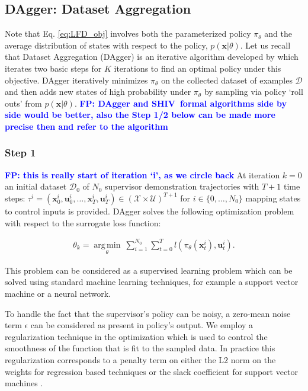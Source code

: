 \documentclass[10pt, conference]{ieeeconf}      %
\DeclareMathOperator*{\argmin}{arg\,min}
\newcommand{\bu}{\mathbf{u}}
\newcommand{\bx}{\mathbf{x}}
\newcommand{\acro}{SHIV}
\newcommand{\fpnote}[1]{\ifthenelse{\boolean{include-notes}}%
 {\textcolor{blue}{\textbf{FP: #1}}}{}}
\begin{document}
 \subsection{DAgger: Dataset Aggregation}
Note that Eq. \ref{eq:LFD_obj} involves both the parameterized policy $\pi_{\theta}$ and the average distribution of
states with respect to the policy, $p(\bx|\theta)$. Let us recall that Dataset Aggregation (DAgger) is an iterative algorithm developed by \cite{ross2010reduction} which iterates two basic steps for $K$ iterations to find an optimal policy under this objective. 
DAgger iteratively minimizes $\pi_{\theta}$ on the collected dataset of examples $\mathcal{D}$ and then adds new states
of high probability under $\pi_\theta$ by sampling via policy `roll outs' from $p(\bx|\theta)$. 
\fpnote{DAgger and \acro~formal algorithms side by side would be better, also the Step 1/2 below can be
made more precise then and refer to the algorithm}

\subsubsection{Step 1}
\fpnote{this is really start of iteration `i', as we circle back}
At iteration $k=0$ an initial dataset $\mathcal{D}_0$ of $N_0$ supervisor demonstration trajectories 
with $T+1$ time steps: $\tau^i=(\bx_0^i, \bu_0^i, \ldots, \bx_T^i, \bu_T^i)\in (\mathcal{X}\times\mathcal{U})^{T+1}$ for $i\in \{0, \ldots, N_0\}$
mapping states to control
inputs is provided. DAgger solves the following optimization problem with respect to the surrogate loss function:

 \vspace{-2ex}
\begin{align}\label{eq:super_objj}
\theta_{k} = \underset{\theta}{\argmin} \: \sum_{i=1}^{N_0}\sum_{t=0}^T l(\pi_{\theta}(\bx_t^{i}),\bu_{t}^i).
\end{align}

This problem can be considered as a supervised learning problem which can be solved using standard machine
learning techniques, for example a support vector machine or a neural network. 
 
To handle the fact that the supervisor's policy can be noisy, a zero-mean noise term $\epsilon$ 
can be considered as present in policy's output. We employ a regularization technique in the optimization which is
used to control the smoothness of the function that is fit to the sampled data. In practice this regularization corresponds to a penalty term on either the L2 norm on the weights for regression based techniques or the slack coefficient for support vector machines \cite{scholkopf2002learning}.
 
\end{document}
